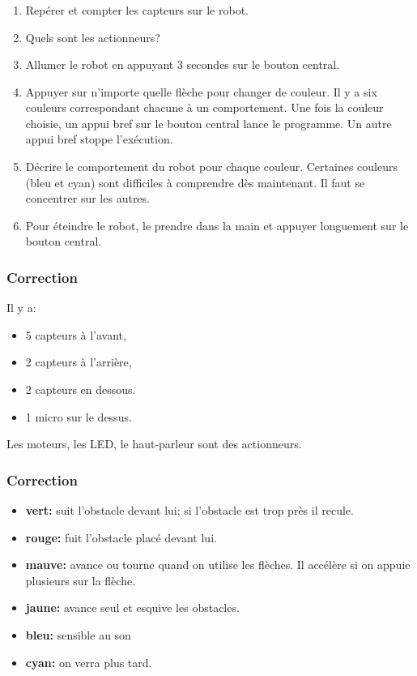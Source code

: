 \documentclass[svgnames,11pt]{beamer}
\begin{document}
\begin{frame}
    \frametitle{}

\begin{activite}
\begin{enumerate}
    \item Repérer et compter les capteurs sur le robot.
    \item Quels sont les actionneurs?
    \item Allumer le robot en appuyant 3 secondes sur le bouton central.
    \item Appuyer sur n'importe quelle flèche pour changer de couleur. Il y a six couleurs correspondant chacune à un comportement. Une fois la couleur choisie, un appui bref sur le bouton central lance le programme. Un autre appui bref stoppe l'exécution.
    \item Décrire le comportement du robot pour chaque couleur. Certaines couleurs (bleu et cyan) sont difficiles à comprendre dès maintenant. Il faut se concentrer sur les autres.
    \item Pour éteindre le robot, le prendre dans la main et appuyer longuement sur le bouton central.
\end{enumerate}
\end{activite}

\end{frame}
\begin{frame}
    \frametitle{Correction}

    Il y a:
    \begin{itemize}
        \item 5 capteurs à l'avant,
        \item 2 capteurs à l'arrière,
        \item 2 capteurs en dessous.
        \item 1 micro sur le dessus.
    \end{itemize}
Les moteurs, les LED, le haut-parleur sont des actionneurs.
\end{frame}
\begin{frame}
    \frametitle{Correction}

    \begin{itemize}
        \item \textbf{vert:} suit l'obstacle devant lui; si l'obstacle est trop près il recule.
        \item \textbf{rouge:} fuit l'obstacle placé devant lui.
        \item \textbf{mauve:} avance ou tourne quand on utilise les flèches. Il accélère si on appuie plusieurs sur la flèche.
        \item \textbf{jaune:} avance seul et esquive les obstacles.
        \item \textbf{bleu:} sensible au son
        \item \textbf{cyan:} on verra plus tard.
    \end{itemize}
    
\end{frame}
\end{document}
